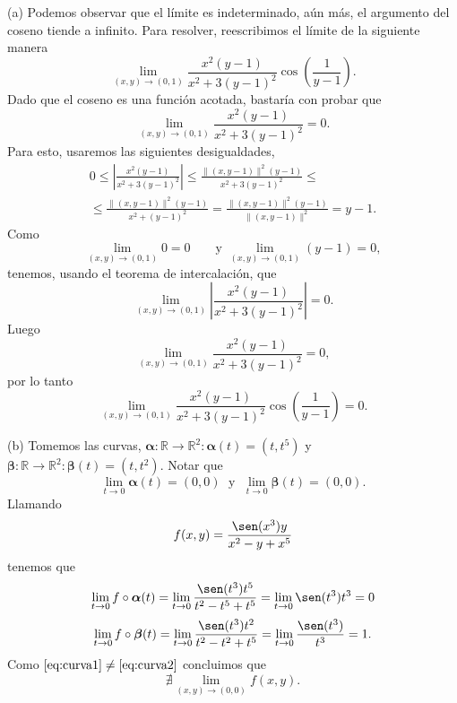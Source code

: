 \begin{solution}
    (a) Podemos observar que el límite es indeterminado, aún más, el argumento del coseno tiende a infinito. Para resolver, reescribimos el límite de la siguiente manera
    \[
        \lim_{(x,y)\to(0,1)} \frac{x^2(y-1)}{x^2+3(y-1)^2}\cos(\frac{1}{y-1}).
    \]
    Dado que el coseno es una función acotada,  bastaría con probar que $$ \lim_{(x,y)\to(0,1)} \frac{x^2(y-1)}{x^2+3(y-1)^2}=0.$$
    Para esto, usaremos las siguientes desigualdades,
    \begin{gather*}
        0 \leq \left|\frac{x^2(y-1)}{x^2+3(y-1)^2}\right| \leq \frac{\|(x,y-1)\|^2(y-1)}{x^2+3(y-1)^2}\leq\\[.2cm]
        \leq
        \frac{\|(x,y-1)\|^2(y-1)}{x^2+(y-1)^2} = \frac{\|(x,y-1)\|^2(y-1)}{\|(x,y-1)\|^2} = y-1.
    \end{gather*}
    Como  $$\lim_{(x,y)\to(0,1)} 0 = 0 \;\;\;\;\;\;\mbox{ y } \lim_{(x,y)\to(0,1)} (y-1) = 0, $$
    tenemos, usando el teorema de intercalaci\'on, que
    $$ \lim_{(x,y)\to(0,1)} \left|\frac{x^2(y-1)}{x^2+3(y-1)^2}\right| = 0.$$
    Luego  $$ \lim_{(x,y)\to(0,1)} \frac{x^2(y-1)}{x^2+3(y-1)^2}=0,$$ por lo tanto $$\lim_{(x,y)\to(0,1)} \frac{x^2(y-1)}{x^2+3(y-1)^2}\cos\left(\frac{1}{y-1}\right) = 0.$$


    (b) Tomemos  las curvas,  $\boldsymbol{\alpha}:\mathbb{R}\to\mathbb{R}^2:  \boldsymbol{\alpha}(t)=(t,t^5)$  \; y \;  $\boldsymbol{\beta}:\mathbb{R}\to\mathbb{R}^2: \boldsymbol{\beta}(t)=(t,t^2)$. Notar que $$\lim_{t\to0}\boldsymbol{\alpha}(t)=(0,0)  \; \mbox{ y } \;   \lim_{t\to0}\boldsymbol{\beta}(t)=(0,0).$$
    Llamando  $$f(x,y) = \frac{\sen(x^3)y}{x^2-y+x^5}$$ tenemos que
    \begin{equation}
        \lim_{t\to0}f\circ\boldsymbol{\alpha}(t) = \lim_{t\to0}\frac{\sen(t^3)t^5}{t^2-t^5+t^5} = \lim_{t\to0}\sen(t^3)t^3 = 0 \label{eq:curva1}
    \end{equation}
    \begin{equation}
        \lim_{t\to0}f\circ\boldsymbol{\beta}(t) = \lim_{t\to0}\frac{\sen(t^3)t^2}{t^2-t^2+t^5} = \lim_{t\to0}\frac{\sen(t^3)}{t^3} = 1. \label{eq:curva2}
    \end{equation}
    Como \; $\eqref{eq:curva1} \neq \eqref{eq:curva2}$
    concluimos  que $$ \nexists\lim_{(x,y)\to(0,0)}
        f(x,y).$$
\end{solution}



